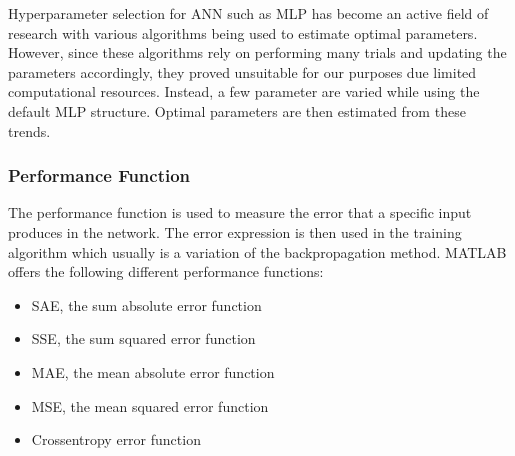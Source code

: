 Hyperparameter selection for ANN such as MLP has become an active field of research with various algorithms being used to estimate optimal parameters\cite{bergstra2011algorithms}. However, since these algorithms rely on performing many trials and updating the parameters accordingly, they proved unsuitable for our purposes due limited computational resources. Instead, a few parameter are varied while using the default MLP structure. Optimal parameters are then estimated from these trends.
%
%
%

 \subsubsection{Performance Function}
 
 The performance function is used to measure the error that a specific input produces in the network. The error expression is then used in the training algorithm which usually is a variation of the backpropagation method\cite{hecht1988theory}. MATLAB offers the following different performance functions:
 
 \begin{itemize}
 	\item SAE, the sum absolute error function
 	\item SSE, the sum squared error function
 	\item MAE, the mean absolute error function
 	\item MSE, the mean squared error function
 	\item Crossentropy error function
 \end{itemize}
 
